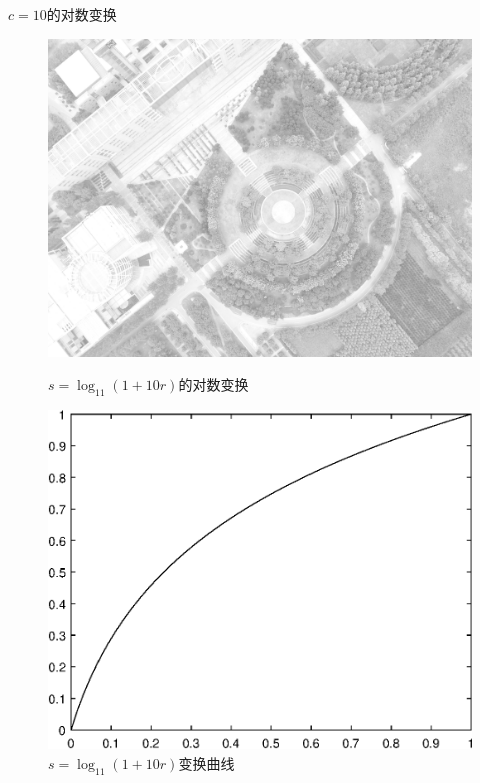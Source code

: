 $c=10$的对数变换
\begin{figure}[H]
	\centering
	\begin{minipage}{0.45\linewidth}
		\includegraphics[width=\linewidth]{figure/DJI_0027_Log_1000.png}
		\caption{$s=\log_{11}(1+10r)$的对数变换}
	\end{minipage}
	\begin{minipage}{0.45\linewidth}
		\includegraphics[width=\linewidth]{figure/DJI_0027_Log_1000_Graph.eps}
		\caption{$s=\log_{11}(1+10r)$变换曲线}
	\end{minipage}
\end{figure}

